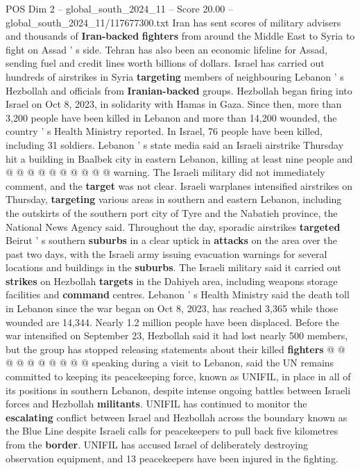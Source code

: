\begin{textsample}{POS Dim 2 – global\_south\_2024\_11 – Score 20.00 – global\_south\_2024\_11/117677300.txt}
Iran has sent scores of military advisers and thousands of \textbf{Iran-backed} \textbf{fighters} from around the Middle East to Syria to fight on Assad ' s side.
Tehran has also been an economic lifeline for Assad, sending fuel and credit lines worth billions of dollars.
Israel has carried out hundreds of airstrikes in Syria \textbf{targeting} members of neighbouring Lebanon ' s Hezbollah and officials from \textbf{Iranian-backed} groups.
Hezbollah began firing into Israel on Oct 8, 2023, in solidarity with Hamas in Gaza.
Since then, more than 3,200 people have been killed in Lebanon and more than 14,200 wounded, the country ' s Health Ministry reported.
In Israel, 76 people have been killed, including 31 soldiers.
Lebanon ' s state media said an Israeli airstrike Thursday hit a building in Baalbek city in eastern Lebanon, killing at least nine people and @ @ @ @ @ @ @ @ @ @ warning.
The Israeli military did not immediately comment, and the \textbf{target} was not clear.
Israeli warplanes intensified airstrikes on Thursday, \textbf{targeting} various areas in southern and eastern Lebanon, including the outskirts of the southern port city of Tyre and the Nabatieh province, the National News Agency said.
Throughout the day, sporadic airstrikes \textbf{targeted} Beirut ' s southern \textbf{suburbs} in a clear uptick in \textbf{attacks} on the area over the past two days, with the Israeli army issuing evacuation warnings for several locations and buildings in the \textbf{suburbs}.
The Israeli military said it carried out \textbf{strikes} on Hezbollah \textbf{targets} in the Dahiyeh area, including weapons storage facilities and \textbf{command} centres.
Lebanon ' s Health Ministry said the death toll in Lebanon since the war began on Oct 8, 2023, has reached 3,365 while those wounded are 14,344.
Nearly 1.2 million people have been displaced.
Before the war intensified on September 23, Hezbollah said it had lost nearly 500 members, but the group has stopped releasing statements about their killed \textbf{fighters} @ @ @ @ @ @ @ @ @ @ speaking during a visit to Lebanon, said the UN remains committed to keeping its peacekeeping force, known as UNIFIL, in place in all of its positions in southern Lebanon, despite intense ongoing battles between Israeli forces and Hezbollah \textbf{militants}.
UNIFIL has continued to monitor the \textbf{escalating} conflict between Israel and Hezbollah across the boundary known as the Blue Line despite Israeli calls for peacekeepers to pull back five kilometres from the \textbf{border}.
UNIFIL has accused Israel of deliberately destroying observation equipment, and 13 peacekeepers have been injured in the fighting.

\end{textsample}
